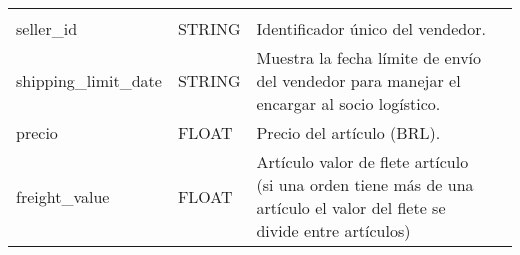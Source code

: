 \documentclass[11pt]{article}
\begin{document}
\begin{longtable}[]{@{}llll@{}}
\begin{minipage}[t]{0.22\columnwidth}
\end{minipage} & \begin{minipage}[t]{0.22\columnwidth}\raggedright
\strut
\end{minipage}\tabularnewline
\begin{minipage}[t]{0.22\columnwidth}\raggedright
seller\_id\strut
\end{minipage} & \begin{minipage}[t]{0.22\columnwidth}\raggedright
STRING\strut
\end{minipage} & \begin{minipage}[t]{0.22\columnwidth}\raggedright
Identificador único del vendedor.\strut
\end{minipage} & \begin{minipage}[t]{0.22\columnwidth}\raggedright
\strut
\end{minipage}\tabularnewline
\begin{minipage}[t]{0.22\columnwidth}\raggedright
shipping\_limit\_date\strut
\end{minipage} & \begin{minipage}[t]{0.22\columnwidth}\raggedright
STRING\strut
\end{minipage} & \begin{minipage}[t]{0.22\columnwidth}\raggedright
Muestra la fecha límite de envío del vendedor para manejar el encargar
al socio logístico.\strut
\end{minipage} & \begin{minipage}[t]{0.22\columnwidth}\raggedright
\strut
\end{minipage}\tabularnewline
\begin{minipage}[t]{0.22\columnwidth}\raggedright
precio\strut
\end{minipage} & \begin{minipage}[t]{0.22\columnwidth}\raggedright
FLOAT\strut
\end{minipage} & \begin{minipage}[t]{0.22\columnwidth}\raggedright
Precio del artículo (BRL).\strut
\end{minipage} & \begin{minipage}[t]{0.22\columnwidth}\raggedright
\strut
\end{minipage}\tabularnewline
\begin{minipage}[t]{0.22\columnwidth}\raggedright
freight\_value\strut
\end{minipage} & \begin{minipage}[t]{0.22\columnwidth}\raggedright
FLOAT\strut
\end{minipage} & \begin{minipage}[t]{0.22\columnwidth}\raggedright
Artículo valor de flete artículo (si una orden tiene más de una artículo
el valor del flete se divide entre artículos)\strut
\end{minipage} & \begin{minipage}[t]{0.22\columnwidth}\raggedright
\strut
\end{minipage}\tabularnewline
\bottomrule
\end{longtable}
\end{document}
